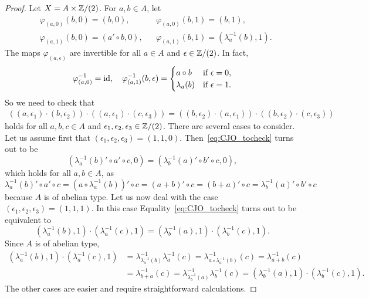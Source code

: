 \begin{proof}
    Let $X=A\times\mathbb{Z}/(2)$. For $a,b\in A$, let 
    \begin{align*}
        &\varphi_{(a,0)}(b,0)=(b,0), && \varphi_{(a,0)}(b,1)=(b,1),\\
        &\varphi_{(a,1)}(b,0)=(a'\circ b,0), && \varphi_{(a,1)}(b,1)=(\lambda^{-1}_a(b),1).
    \end{align*}
    The maps $\varphi_{(a,\epsilon)}$ are invertible 
    for all $a\in A$ and $\epsilon\in\mathbb{Z}/(2)$. In fact, 
    \[
    \varphi_{(a,0)}^{-1}=\operatorname{id},
    \quad
    \varphi_{(a,1)}^{-1}(b,\epsilon)=\begin{cases}
    a\circ b & \text{if $\epsilon=0$,}\\
    \lambda_a(b) & \text{if $\epsilon=1$.}
    \end{cases}
    \]
    So we need to check that 
    \begin{align}
    \label{eq:CJO_tocheck}
    ((a,\epsilon_1)\cdot (b,\epsilon_2))\cdot ((a,\epsilon_1)\cdot (c,\epsilon_3))
    =((b,\epsilon_2)\cdot (a,\epsilon_1))\cdot ((b,\epsilon_2)\cdot (c,\epsilon_3))
    \end{align}
    holds for all $a,b,c\in A$ and $\epsilon_1,\epsilon_2,\epsilon_3\in\mathbb{Z}/(2)$. There are several cases to consider. 
    Let us assume first
    that $(\epsilon_1,\epsilon_2,\epsilon_3)=(1,1,0)$. Then~\eqref{eq:CJO_tocheck} turns out to be 
    \[
    (\lambda^{-1}_a(b)'\circ a'\circ c,0)=(\lambda^{-1}_b(a)'\circ b'\circ c,0),
    \]
    which holds for all $a,b\in A$, as  
    \[
    \lambda^{-1}_a(b)'\circ a'\circ c=(a\circ \lambda^{-1}_a(b))'\circ c=(a+b)'\circ c=(b+a)'\circ c=\lambda^{-1}_b(a)'\circ b'\circ c
    \]
    because $A$ is of abelian type. Let us now deal with the case $(\epsilon_1,\epsilon_2,\epsilon_3)=(1,1,1)$. In this case 
    Equality~\eqref{eq:CJO_tocheck}
    turns out to be equivalent to 
    \[
    (\lambda^{-1}_a(b),1)\cdot (\lambda^{-1}_a(c),1)
    =(\lambda^{-1}_b(a),1)\cdot (\lambda^{-1}_b(c),1).
    \]
    Since $A$ is of abelian type,
    \begin{align*}
        (\lambda^{-1}_a(b),1)\cdot (\lambda^{-1}_a(c),1)
        &= \lambda^{-1}_{\lambda^{-1}_a(b)}\lambda^{-1}_a(c)
        = \lambda^{-1}_{a\circ\lambda^{-1}_a(b)}(c)
        = \lambda^{-1}_{a+b}(c)\\
        &= \lambda^{-1}_{b+a}(c)
        = \lambda^{-1}_{\lambda^{-1}_b(a)}\lambda^{-1}_b(c)
        = (\lambda^{-1}_b(a),1)\cdot (\lambda^{-1}_b(c),1).
    \end{align*}
    The other cases are easier and require straightforward calculations. 
    

\end{proof}
